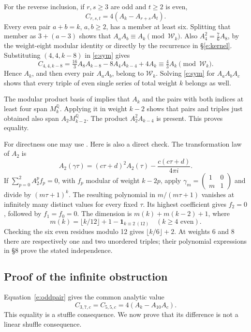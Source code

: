 \documentclass[12pt]{amsart}
\theoremstyle{definition}
\theoremstyle{remark}
\numberwithin{equation}{section}
\newcommand{\Q}{\mathbb{Q}}
\newcommand{\WW}{\mathcal W}
\numberwithin{equation}{section}
\begin{document}
For the reverse inclusion, if $r,s\ge3$ are odd and $t\ge2$ is even,
\begin{equation}\label{e:oddpair}
 C_{r,s,t}=4(A_k-A_{r+s}A_t).
\end{equation}
Every even pair $a+b=k$, $a,b\ge2$, has a member at least six.
Splitting that member as $3+(a-3)$ shows that $A_aA_b\equiv A_k\pmod{\WW_k}$.
Also $A_4^2=\frac76 A_8$, by the weight-eight modular identity or directly
by the recurrence in \S\ref{e:kernel}. Substituting $(4,4,k-8)$ in
\eqref{e:sym} gives
\[
 C_{4,4,k-8}=\tfrac{16}{3}A_8A_{k-8}-8A_4A_{k-4}+4A_k
             \equiv\tfrac43 A_k\pmod{\WW_k}.
\]
Hence $A_k$, and then every pair $A_aA_b$, belong to $\WW_k$.
Solving \eqref{e:sym} for $A_aA_bA_c$ shows that every triple of even
single series of total weight $k$ belongs as well.

The modular product basis of \cite[Corollary 2, arXiv v1]{hirose}
implies that $A_k$ and the pairs with both indices at least four span
$M_k^{\Q}$. Applying it in weight $k-2$ shows that pairs and triples just
obtained also span $A_2M_{k-2}^{\Q}$. The product $A_2^2A_{k-4}$ is present.
This proves equality.

For directness one may use \cite[Proposition 1(b)]{kzqm}. Here is also a
direct check. The transformation law of $A_2$ is
\[
 A_2(\gamma\tau)=(c\tau+d)^2A_2(\tau)-\frac{c(c\tau+d)}{4\pi i}.
\]
If $\sum_{p=0}^2 A_2^pf_p=0$, with $f_p$ modular of weight $k-2p$,
apply $\gamma_m=\left(\begin{smallmatrix}1&0\\m&1\end{smallmatrix}\right)$
and divide by $(m\tau+1)^k$. The resulting polynomial in
$m/(m\tau+1)$ vanishes at infinitely many distinct values for every fixed
$\tau$. Its highest coefficient gives $f_2=0$, followed by $f_1=f_0=0$.
The dimension is $m(k)+m(k-2)+1$, where
\[
 m(k)=\lfloor k/12\rfloor+1-\mathbf1_{k\equiv2\ (12)}
 \quad(k\ge4\text{ even}).
\]
Checking the six even residues modulo 12 gives $\lfloor k/6\rfloor+2$.
At weights 6 and 8 there are respectively one and two unordered triples;
their polynomial expressions in \S8 prove the stated independence.

\subsection{Proof of the infinite obstruction}
Equation~\eqref{e:oddpair} gives the common analytic value
\[
 C_{3,7,c}=C_{5,5,c}=4(A_k-A_{10}A_c).
\]
This equality is a stuffle consequence. We now prove that its difference
is not a linear shuffle consequence.
\end{document}
